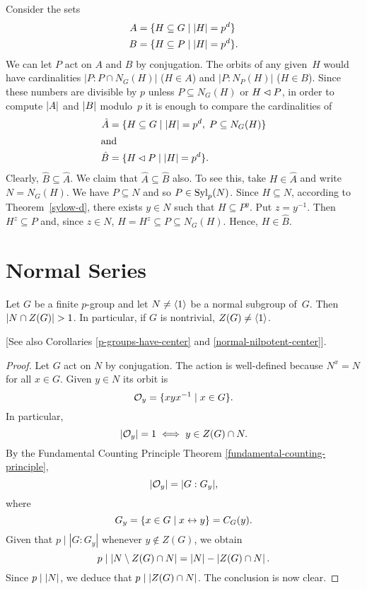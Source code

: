 \begin{solution}
Consider the sets
    \begin{align*}
        A &= \{H\subseteq G\mid \left\vert{H}\right\vert=p^d\}\\
        B &= \{H\subseteq P\mid \left\vert{H}\right\vert=p^d\}.
    \end{align*}
    We can let $P$ act on $A$ and $B$ by conjugation. The orbits of any given~$H$ would have cardinalities $|P:P\cap N_G(H)|$ ($H\in A$) and $|P:N_P(H)|$ ($H\in B$). Since these numbers are divisible by $p$ unless $P\subseteq N_G(H)$ or $H\lhd P$, in order to compute $\left\vert{A}\right\vert$ and $\left\vert{B}\right\vert$ modulo~$p$ it is enough to compare the cardinalities of
    \begin{align*}
        \hat A &= \{H\subseteq G\mid \left\vert{H}\right\vert=p^d,\;P\subseteq N_G(H)\}\\
        \intertext{and}
        \hat B &= \{H\lhd P\mid \left\vert{H}\right\vert=p^d\}.
    \end{align*}
    Clearly, $\hat B\subseteq\hat A$. We claim that $\hat A\subseteq\hat B$ also. To see this, take $H\in\hat A$ and write $N=N_G(H)$. We have $P\subseteq N$ and so $P\in{\rm Syl}_p(N)$. Since $H\subseteq N$, according to Theorem~\ref{sylow-d}, there exists $y\in N$ such that $H\subseteq P^y$. Put $z=y^{-1}$. Then $H^z\subseteq P$ and, since $z\in N$, $H=H^z\subseteq P\subseteq N_G(H)$. Hence, $H\in\hat B$.  \end{solution}

\section{Normal Series}

\begin{thm}\label{nontrivial-center}
    Let $G$ be a finite $p$-group and let $N\ne\langle1\rangle$ be a normal subgroup of\/~$G$. Then $\left\vert{N\cap Z(G)}\right\vert>1$. In particular, if\/ $G$ is nontrivial, $Z(G)\ne\langle1\rangle$.

    \textrm{\rm[See also Corollaries \ref{p-groups-have-center} and \ref{normal-nilpotent-center}].}
\end{thm}

\begin{proof} Let $G$ act on $N$ by conjugation. The action is well-defined because $N^x=N$ for all $x\in G$. Given $y\in N$ its orbit is
$$
    {\cal O}_y = \{xyx^{-1}\mid x\in G\}.
$$
In particular,
$$
    |{\cal O}_y| = 1 \iff y\in Z(G)\cap N.
$$
By the Fundamental Counting Principle Theorem \ref{fundamental-counting-principle},
$$
    |{\cal O}_y| = |G: G_y|,
$$
where
$$
    G_y = \{x\in G\mid x\leftrightarrow y\} = C_G(y).
$$
Given that $p\mid|G:G_y|$ whenever $y\notin Z(G)$, we obtain
$$
    p\mid |N\setminus Z(G)\cap N|=\left\vert{N}\right\vert-\left\vert{Z(G)\cap N}\right\vert.
$$
Since $p\mid\left\vert{N}\right\vert$, we deduce that $p\mid\left\vert{Z(G)\cap N}\right\vert$. The conclusion is now clear.  \end{proof}


